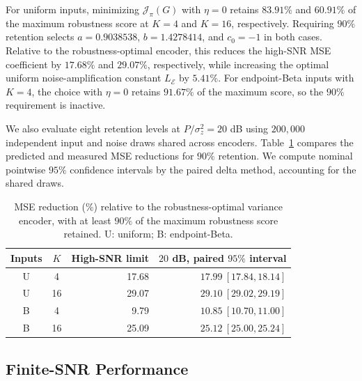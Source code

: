 \documentclass[journal,12pt,onecolumn,draftclsnofoot]{IEEEtran}
\newcommand{\enc}{\mathscr{E}}\newcommand{\dec}{\mathscr{D}}\newcommand{\R}{\mathbb R}\newcommand{\C}{\mathbb C}
\begin{document}



For uniform inputs, minimizing $\mathcal J_\pi(G)$ with $\eta=0$
retains $83.91\%$ and $60.91\%$ of the maximum robustness score
at $K=4$ and $K=16$, respectively. Requiring $90\%$ retention
selects $a=0.9038538$, $b=1.4278414$, and $c_0=-1$ in both cases.
Relative to the robustness-optimal encoder, this reduces the
high-SNR MSE coefficient by $17.68\%$ and $29.07\%$, respectively,
while increasing the optimal uniform noise-amplification constant $L_\enc$
by $5.41\%$. For endpoint-Beta inputs with $K=4$, the choice with $\eta=0$ retains $91.67\%$ of the maximum score, so the $90\%$
requirement is inactive.

We also evaluate eight retention levels at
$P/\sigma_z^2=20$ dB using $200{,}000$ independent input and noise
draws shared across encoders. Table~\ref{tab:pareto} compares the
predicted and measured MSE reductions for $90\%$ retention.
We compute nominal pointwise $95\%$ confidence intervals by the
paired delta method, accounting for the shared draws. 






\begin{table}[t]
\caption{MSE reduction (\%) relative to the robustness-optimal variance encoder, with at least $90\%$ of the maximum robustness score retained. U: uniform; B: endpoint-Beta.}
\label{tab:pareto}
\centering\small
\begin{tabular}{@{}ccrr@{}}\toprule
Inputs & $K$ & High-SNR limit & $20$ dB, paired $95\%$ interval\\\midrule
U & 4 & 17.68 & $17.99\ [17.84,18.14]$\\
U & 16 & 29.07 & $29.10\ [29.02,29.19]$\\
B & 4 & 9.79 & $10.85\ [10.70,11.00]$\\
B & 16 & 25.09 & $25.12\ [25.00,25.24]$\\\bottomrule
\end{tabular}
\end{table}


\subsection{Finite-SNR Performance}\label{sec:finite-noise}
\end{document}
